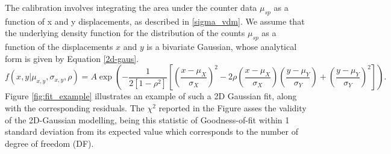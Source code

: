 The calibration involves integrating the area under the counter data $\mu_{sp}$ as a function of x and y displacements, as described in \eqref{sigma_vdm}. We assume that the underlying density function for the distribution of the counts $\mu_{sp}$ as a function of the displacements $x$ and $y$ is a bivariate Gaussian, whose analytical form is given by Equation \eqref{2d-gaus}. 
\begin{equation}
    f(x,y|\mu_{x,y},\sigma_{x,y},\rho)=A\exp{\left(-{\frac {1}{2\left[1-\rho ^{2}\right]}}\left[\left({\frac {x-\mu _{X}}{\sigma _{X}}}\right)^{2}-2\rho \left({\frac {x-\mu _{X}}{\sigma _{X}}}\right)\left({\frac {y-\mu _{Y}}{\sigma _{Y}}}\right)+\left({\frac {y-\mu _{Y}}{\sigma _{Y}}}\right)^{2}\right]\right)}\label{2d-gaus}.
\end{equation}
Figure \ref{fig:fit_example} illustrates an example of such a 2D Gaussian fit, along with the corresponding residuals. The $\chi^2$ reported in the Figure asses the validity of the 2D-Gaussian modelling, being this statistic of Goodness-of-fit within 1 standard deviation from its expected value which corresponds to the number of degree of freedom (DF).


